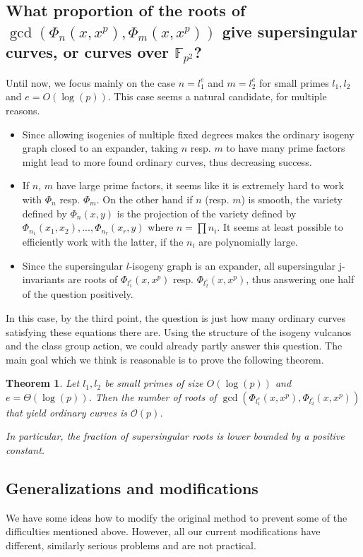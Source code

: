 \documentclass{scrartcl}
\newcommand{\F}{\mathbb{F}}
\renewcommand{\O}{\mathcal{O}}
\newtheorem{theorem}[prop]{Theorem}
\theoremstyle{definition}
\begin{document}
\subsection*{What proportion of the roots of $\gcd(\Phi_n(x, x^p), \Phi_m(x, x^p))$ give supersingular curves, or curves over $\F_{p^2}$?}
Until now, we focus mainly on the case $n = l_1^e$ and $m = l_2^e$ for small primes $l_1, l_2$ and $e = O(\log(p))$.
This case seems a natural candidate, for multiple reasons.
\begin{itemize}
    \item Since allowing isogenies of multiple fixed degrees makes the ordinary isogeny graph closed to an expander, taking $n$ resp. $m$ to have many prime factors might lead to more found ordinary curves, thus decreasing success.
    \item If $n$, $m$ have large prime factors, it seems like it is extremely hard to work with $\Phi_n$ resp. $\Phi_m$. On the other hand if $n$ (resp. $m$) is smooth, the variety defined by $\Phi_n(x, y)$ is the projection of the variety defined by $\Phi_{n_1}(x_1, x_2), ..., \Phi_{n_r}(x_r, y)$ where $n = \prod n_i$. It seems at least possible to efficiently work with the latter, if the $n_i$ are polynomially large.
    \item Since the supersingular $l$-isogeny graph is an expander, all supersingular j-invariants are roots of $\Phi_{l_1^e}(x, x^p)$ resp. $\Phi_{l_2^e}(x, x^p)$, thus answering one half of the question positively.
\end{itemize}
In this case, by the third point, the question is just how many ordinary curves satisfying these equations there are.
Using the structure of the isogeny vulcanos and the class group action, we could already partly answer this question.
The main goal which we think is reasonable is to prove the following theorem.
\begin{theorem}
    Let $l_1, l_2$ be small primes of size $O(\log(p))$ and $e = \Theta(\log(p))$.
    Then the number of roots of $\gcd(\Phi_{l_1^e}(x, x^p), \Phi_{l_2^e}(x, x^p))$ that yield ordinary curves is $\O(p)$.

    In particular, the fraction of supersingular roots is lower bounded by a positive constant.
\end{theorem}

\subsection*{Generalizations and modifications}
We have some ideas how to modify the original method to prevent some of the difficulties mentioned above.
However, all our current modifications have different, similarly serious problems and are not practical.
\end{document}
